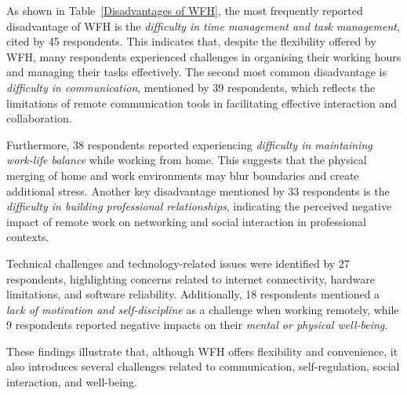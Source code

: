\documentclass[a4paper, conference]{IEEEtran}
\begin{document}
As shown in Table~\ref{Disadvantages of WFH}, the most frequently reported disadvantage of WFH is the \textit{difficulty in time management and task management}, cited by 45 respondents. This indicates that, despite the flexibility offered by WFH, many respondents experienced challenges in organising their working hours and managing their tasks effectively. The second most common disadvantage is \textit{difficulty in communication}, mentioned by 39 respondents, which reflects the limitations of remote communication tools in facilitating effective interaction and collaboration.

Furthermore, 38 respondents reported experiencing \textit{difficulty in maintaining work-life balance} while working from home. This suggests that the physical merging of home and work environments may blur boundaries and create additional stress. Another key disadvantage mentioned by 33 respondents is the \textit{difficulty in building professional relationships}, indicating the perceived negative impact of remote work on networking and social interaction in professional contexts.

Technical challenges and technology-related issues were identified by 27 respondents, highlighting concerns related to internet connectivity, hardware limitations, and software reliability. Additionally, 18 respondents mentioned a \textit{lack of motivation and self-discipline} as a challenge when working remotely, while 9 respondents reported negative impacts on their \textit{mental or physical well-being}.

These findings illustrate that, although WFH offers flexibility and convenience, it also introduces several challenges related to communication, self-regulation, social interaction, and well-being.
\end{document}
